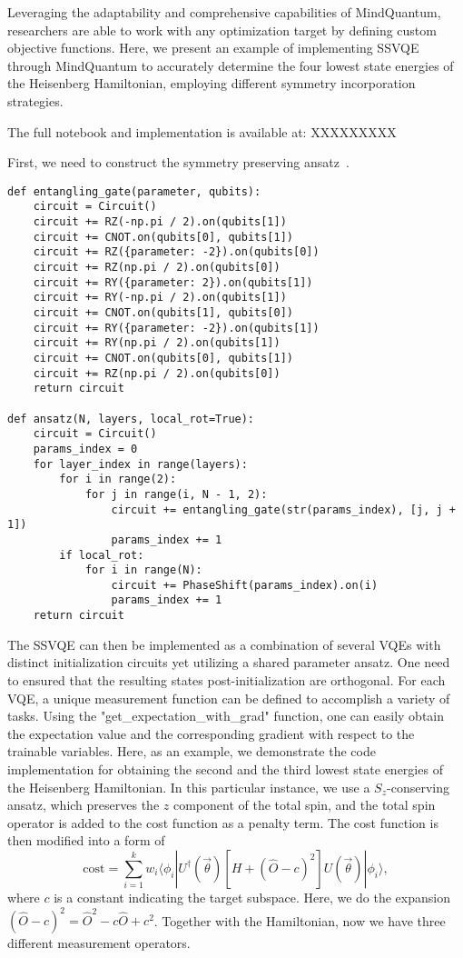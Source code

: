 Leveraging the adaptability and comprehensive capabilities of MindQuantum, researchers are able to work with any optimization target by defining custom objective functions. Here, we present an example of implementing SSVQE through MindQuantum to accurately determine the four lowest state energies of the Heisenberg Hamiltonian, employing different symmetry incorporation strategies.


The full notebook and implementation is available at:
XXXXXXXXX

First, we need to construct the symmetry preserving ansatz~\cite{?}.
\begin{lstlisting}
def entangling_gate(parameter, qubits):
    circuit = Circuit()
    circuit += RZ(-np.pi / 2).on(qubits[1])
    circuit += CNOT.on(qubits[0], qubits[1])
    circuit += RZ({parameter: -2}).on(qubits[0])
    circuit += RZ(np.pi / 2).on(qubits[0])
    circuit += RY({parameter: 2}).on(qubits[1])
    circuit += RY(-np.pi / 2).on(qubits[1])
    circuit += CNOT.on(qubits[1], qubits[0])
    circuit += RY({parameter: -2}).on(qubits[1])
    circuit += RY(np.pi / 2).on(qubits[1])
    circuit += CNOT.on(qubits[0], qubits[1])
    circuit += RZ(np.pi / 2).on(qubits[0])
    return circuit

def ansatz(N, layers, local_rot=True):
    circuit = Circuit()
    params_index = 0
    for layer_index in range(layers):
        for i in range(2):
            for j in range(i, N - 1, 2):
                circuit += entangling_gate(str(params_index), [j, j + 1])
                params_index += 1
        if local_rot:
            for i in range(N):
                circuit += PhaseShift(params_index).on(i)
                params_index += 1
    return circuit
\end{lstlisting}

The SSVQE can then be implemented as a combination of several VQEs with distinct initialization circuits yet utilizing a shared parameter ansatz. One need to ensured that the resulting states post-initialization are orthogonal.
For each VQE, a unique measurement function can be defined to accomplish a variety of tasks.
Using the "get\_expectation\_with\_grad" function, one can easily obtain the expectation value and the corresponding gradient with respect to the trainable variables. Here, as an example, we demonstrate the code implementation for obtaining the second and the third lowest state energies of the Heisenberg Hamiltonian. In this particular instance,
we use a $S_z$-conserving ansatz, which preserves the $z$ component of the total spin, and the total spin operator is added to the cost function as a penalty term. The cost function is then modified into a form of
\begin{equation}
    \mathrm{cost} = \sum_{i=1}^{k} w_{i} \langle \phi_{i}| U^{\dagger}(\vec{\theta}) [H + (\hat{O} - c)^2] U(\vec{\theta}) | \phi_{i} \rangle,
    \label{ssvqe_cost_pen}
\end{equation}
where $c$ is a constant indicating the target subspace. Here, we do the expansion $(\hat{O} - c)^2 {=} \hat{O}^2 {-} c\hat{O} {+} c^2$. Together with the Hamiltonian, now we have three different measurement operators.


